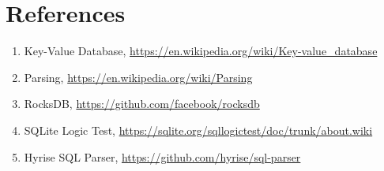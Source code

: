 \documentclass[12pt,a4paper]{article}
\begin{document}
\section{References}
\begin{enumerate}
    \item Key-Value Database, \url{https://en.wikipedia.org/wiki/Key-value_database}
    \item Parsing, \url{https://en.wikipedia.org/wiki/Parsing}
    \item RocksDB, \url{https://github.com/facebook/rocksdb}
    \item SQLite Logic Test, \url{https://sqlite.org/sqllogictest/doc/trunk/about.wiki}
    \item Hyrise SQL Parser, \url{https://github.com/hyrise/sql-parser}
\end{enumerate}
\end{document}

